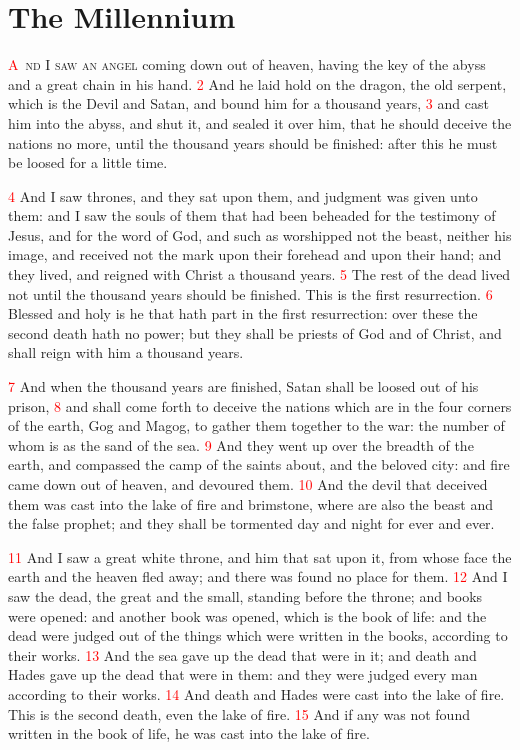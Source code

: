 \documentclass[12pt,twoside]{memoir}
\newcommand{\vnum}[1]{\textcolor{red}{\normalsize{#1}}}
\begin{document}
\chapter{The Millennium}
\lettrine[lines=3,slope=-0.5em]{\textcolor{red}{A}}{\ nd I saw an angel} coming down out of heaven, having the key of the abyss and a great chain in his hand. 
\vnum{2} And he laid hold on the dragon, the old serpent, which is the Devil and Satan, and bound him for a thousand years, 
\vnum{3} and cast him into the abyss, and shut it, and sealed it over him, that he should deceive the nations no more, until the thousand years should be finished: after this he must be loosed for a little time.

\vnum{4} And I saw thrones, and they sat upon them, and judgment was given unto them: and I saw the souls of them that had been beheaded for the testimony of Jesus, and for the word of God, and such as worshipped not the beast, neither his image, and received not the mark upon their forehead and upon their hand; and they lived, and reigned with Christ a thousand years. 
\vnum{5} The rest of the dead lived not until the thousand years should be finished. This is the first resurrection. 
\vnum{6} Blessed and holy is he that hath part in the first resurrection: over these the second death hath no power; but they shall be priests of God and of Christ, and shall reign with him a thousand years.

\vnum{7} And when the thousand years are finished, Satan shall be loosed out of his prison, 
\vnum{8} and shall come forth to deceive the nations which are in the four corners of the earth, Gog and Magog, to gather them together to the war: the number of whom is as the sand of the sea. 
\vnum{9} And they went up over the breadth of the earth, and compassed the camp of the saints about, and the beloved city: and fire came down out of heaven, and devoured them. 
\vnum{10} And the devil that deceived them was cast into the lake of fire and brimstone, where are also the beast and the false prophet; and they shall be tormented day and night for ever and ever.

\vnum{11} And I saw a great white throne, and him that sat upon it, from whose face the earth and the heaven fled away; and there was found no place for them. 
\vnum{12} And I saw the dead, the great and the small, standing before the throne; and books were opened: and another book was opened, which is the book of life: and the dead were judged out of the things which were written in the books, according to their works. 
\vnum{13} And the sea gave up the dead that were in it; and death and Hades gave up the dead that were in them: and they were judged every man according to their works. 
\vnum{14} And death and Hades were cast into the lake of fire. This is the second death, even the lake of fire. 
\vnum{15} And if any was not found written in the book of life, he was cast into the lake of fire.
\end{document}
